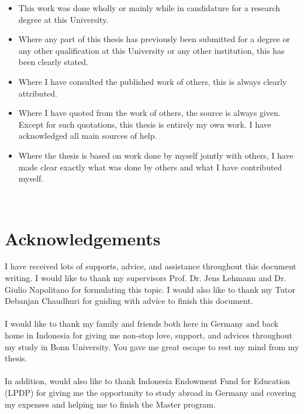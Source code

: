 \documentclass[a4paper,12pt]{report}
\begin{document}
\begin{itemize}
	\item This work was done wholly or mainly while in candidature for
	a research degree at this University.
	\item Where any part of this thesis has previously been submitted for a degree
	or any other qualification at this University or any other institution,
	this has been clearly stated.
	\item Where I have consulted the published work of others, this is always
	clearly attributed.
	\item Where I have quoted from the work of others, the source is always
	given. Except for such quotations, this thesis is entirely my own work.
	I have acknowledged all main sources of help.
	\item Where the thesis is based on work done by myself jointly with others,
	I have made clear exactly what was done by others and what I have
	contributed myself.
\end{itemize}

\vskip5mm
\underline{}\\

\underline{}


\chapter*{Acknowledgements}
I have received lots of supports, advice, and assistance throughout
this document writing. I would like to thank my supervisors Prof. Dr.
Jens Lehmann and Dr. Giulio Napolitano for formulating this topic. I
would also like to thank my Tutor Debanjan Chaudhuri for guiding with
advice to finish this document. 
\\~\\
I would like to thank my family and friends both here in Germany and
back home in Indonesia for giving me non-stop love, support, and
advices throughout my study in Bonn University. You gave me great
escape to rest my mind from my thesis.
\\~\\
In addition, would also like to thank Indonesia Endowment Fund for
Education (LPDP) for giving me the opportunity to study abroad in
Germany and covering my expenses and helping me to finish the Master
program.
\end{document}
